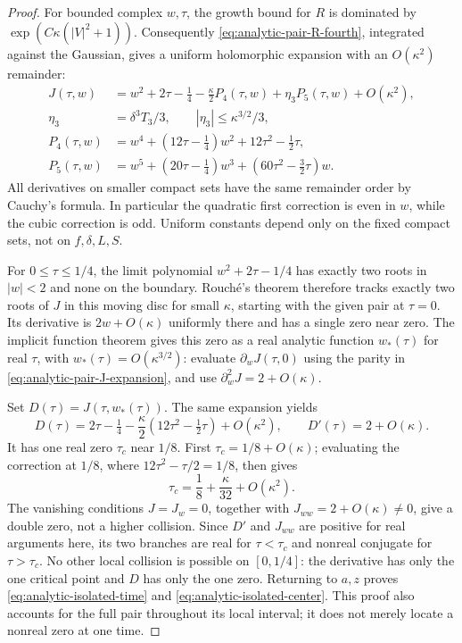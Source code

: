 \begin{proof}
For bounded complex $w,\tau$, the growth bound for $R$
is dominated by $\exp(C\kappa(|V|^2+1))$.
Consequently \eqref{eq:analytic-pair-R-fourth}, integrated
against the Gaussian, gives a uniform holomorphic expansion
with an $O(\kappa^2)$ remainder:
\begin{align}
 J(\tau,w)
  &=w^2+2\tau-\tfrac14-\frac{\kappa}{2}P_4(\tau,w)
                  +\eta_3 P_5(\tau,w)+O(\kappa^2),
                    \label{eq:analytic-pair-J-expansion}\\
 \eta_3&=\delta^3T_3/3,\qquad |\eta_3|\le\kappa^{3/2}/3,\nonumber\\
 P_4(\tau,w)
  &=w^4+(12\tau-\tfrac14)w^2+12\tau^2-\tfrac12\tau,\nonumber\\
 P_5(\tau,w)
  &=w^5+(20\tau-\tfrac14)w^3
                         +(60\tau^2-\tfrac32\tau)w.\nonumber
\end{align}
All derivatives on smaller compact sets have the same
remainder order by Cauchy's formula. In particular the
quadratic first correction is even in $w$, while the
cubic correction is odd. Uniform constants depend only
on the fixed compact sets, not on $f,\delta,L,S$.

For $0\le\tau\le1/4$, the limit polynomial
$w^2+2\tau-1/4$ has exactly two roots in $|w|<2$ and
none on the boundary. Rouch\'e's theorem therefore tracks
exactly two roots of $J$ in this moving disc for small
$\kappa$, starting with the given pair at $\tau=0$.
Its derivative is $2w+O(\kappa)$ uniformly there and has
a single zero near zero. The implicit function theorem
gives this zero as a real analytic function $w_*(\tau)$
for real $\tau$, with
$w_*(\tau)=O(\kappa^{3/2})$: evaluate
$\partial_wJ(\tau,0)$ using the parity in
\eqref{eq:analytic-pair-J-expansion}, and use
$\partial_w^2J=2+O(\kappa)$.

Set $D(\tau)=J(\tau,w_*(\tau))$. The same expansion yields
\[
 D(\tau)=2\tau-\tfrac14
              -\frac{\kappa}{2}(12\tau^2-\tfrac12\tau)
              +O(\kappa^2),\qquad D'(\tau)=2+O(\kappa).
\]
It has one real zero $\tau_c$ near $1/8$. First
$\tau_c=1/8+O(\kappa)$; evaluating the correction at $1/8$,
where $12\tau^2-\tau/2=1/8$, then gives
\[
                       \tau_c=\frac18+\frac{\kappa}{32}
                                                  +O(\kappa^2).
\]
The vanishing conditions $J=J_w=0$, together with
$J_{ww}=2+O(\kappa)\ne0$, give a double zero, not a higher
collision. Since $D'$ and $J_{ww}$ are positive for real
arguments here, its two branches are real for
$\tau<\tau_c$ and nonreal conjugate for $\tau>\tau_c$.
No other local collision is possible on $[0,1/4]$:
the derivative has only the one critical point and $D$
has only the one zero. Returning to $a,z$ proves
\eqref{eq:analytic-isolated-time} and
\eqref{eq:analytic-isolated-center}. This proof also
accounts for the full pair throughout its local interval;
it does not merely locate a nonreal zero at one time.
\end{proof}

